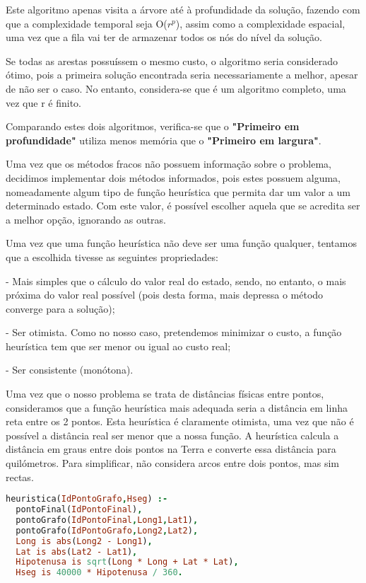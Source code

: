 \documentclass[a4paper]{article}
\begin{document}
Este algoritmo apenas visita a árvore até à profundidade da solução, fazendo com que a complexidade temporal seja O($r ^ p$), assim como a complexidade espacial, uma vez que a fila vai ter de armazenar todos os nós do nível da solução.

Se todas as arestas possuíssem o mesmo custo, o algoritmo seria considerado ótimo, pois a primeira solução encontrada seria necessariamente a melhor, apesar de não ser o caso. No entanto, considera-se que é um algoritmo completo, uma vez que r é finito.

Comparando estes dois algoritmos, verifica-se que o \textbf{"Primeiro em profundidade"} utiliza menos memória que o \textbf{"Primeiro em largura"}.

Uma vez que os métodos fracos não possuem informação sobre o problema, decidimos implementar dois métodos informados, pois estes possuem alguma, nomeadamente algum tipo de função heurística que permita dar um valor a um determinado estado. Com este valor, é possível escolher aquela que se acredita ser a melhor opção, ignorando as outras.

Uma vez que uma função heurística não deve ser uma função qualquer, tentamos que a escolhida tivesse as seguintes propriedades:

- Mais simples que o cálculo do valor real do estado, sendo, no entanto, o mais próxima do valor real possível (pois desta forma, mais depressa o método converge para a solução);

- Ser otimista. Como no nosso caso, pretendemos minimizar o custo, a função heurística tem que ser menor ou igual ao custo real;

- Ser consistente (monótona).

Uma vez que o nosso problema se trata de distâncias físicas entre pontos, consideramos que a função heurística mais adequada seria a distância em linha reta entre os 2 pontos. Esta heurística é claramente otimista, uma vez que não é possível a distância real ser menor que a nossa função. A heurística calcula a distância em graus entre dois pontos na Terra e converte essa distância para quilómetros. Para simplificar, não considera arcos entre dois pontos, mas sim rectas.

\begin{lstlisting}[language=Prolog,xleftmargin=.1\textwidth]
heuristica(IdPontoGrafo,Hseg) :-
  pontoFinal(IdPontoFinal),
  pontoGrafo(IdPontoFinal,Long1,Lat1),
  pontoGrafo(IdPontoGrafo,Long2,Lat2),
  Long is abs(Long2 - Long1),
  Lat is abs(Lat2 - Lat1),
  Hipotenusa is sqrt(Long * Long + Lat * Lat),
  Hseg is 40000 * Hipotenusa / 360.
\end{lstlisting}
\end{document}
